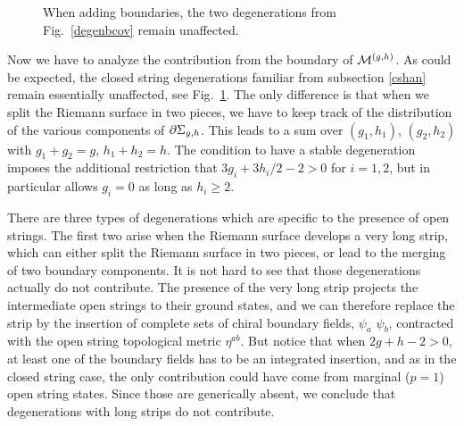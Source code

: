 \begin{figure}[ht]
\qquad
{}
\caption{When adding boundaries, the two degenerations from Fig.\ 
\ref{degenbcov} remain unaffected.}
\label{degenopen1}
\end{figure}
Now we have to analyze the contribution from the boundary of ${\cal M}^{(g,h)}$. 
As could be expected, the closed string degenerations familiar from 
subsection \ref{cshan} remain essentially unaffected, see Fig.\ 
\ref{degenopen1}. The only difference is that when we split the 
Riemann surface in two pieces, we have to keep track of the distribution 
of the various components of $\partial\Sigma_{g,h}$. This leads to a sum 
over $(g_1,h_1)$, $(g_2,h_2)$ with $g_1+g_2=g$, $h_1+h_2=h$. The 
condition to have a stable degeneration imposes the additional
restriction that $3g_i+3h_i/2-2>0$ for $i=1,2$, but in particular 
allows $g_i=0$ as long as $h_i\ge 2$.

There are three types of degenerations which are specific to the
presence of open strings. The first two arise when the Riemann
surface develops a very long strip, which can either split the
Riemann surface in two pieces, or lead to the merging of two
boundary components. It is not hard to see that those degenerations
actually do not contribute. The presence of the very long strip 
projects the intermediate open strings to their ground states, and 
we can therefore replace the strip by the insertion of complete 
sets of chiral boundary fields, $\psi_a$ $\psi_b$, contracted with
the open string topological metric $\eta^{ab}$. But notice that when 
$2g+h-2>0$, at least one of the boundary fields has to be an 
integrated insertion, and as in the closed string case, the only
contribution could have come from marginal ($p=1$) open string
states. Since those are generically absent, we conclude that 
degenerations with long strips do not contribute. 

